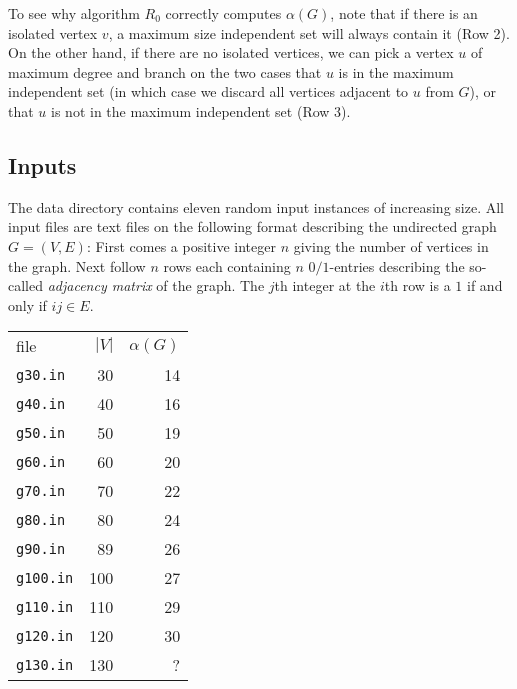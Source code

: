\documentclass{tufte-handout}
\begin{document}
\begin{enumerate}
\end{enumerate}
To see why algorithm $R_0$ correctly computes $\alpha(G)$, note that
if there is an isolated vertex $v$, a maximum size independent set
will always contain it (Row 2).
On the other hand, if there are no isolated vertices, we can pick a
vertex $u$ of maximum degree and branch on the two cases that $u$ is
in the maximum independent set (in which case we discard all vertices
adjacent to $u$ from $G$), or that $u$ is not in the maximum
independent set (Row 3).

\subsection{Inputs}

The data directory contains eleven random input instances of
increasing size. 
All input files are text files on the following format describing the
undirected graph $G=(V,E)$: First comes a positive integer $n$ giving
the number of vertices in the graph.
Next follow $n$ rows each containing $n$ $0/1$-entries describing the
so-called \emph{adjacency matrix} of the graph.
The $j$th integer at the $i$th row is a $1$ if and only if $ij\in E$.

\begin{marginfigure}
\begin{tabular}{lrr}
file & $|V|$ & $\alpha(G)$\\
 \texttt{g30.in} & 30 & 14\\
 \texttt{g40.in} & 40 & 16\\
 \texttt{g50.in} & 50 & 19\\
 \texttt{g60.in} & 60 & 20\\
 \texttt{g70.in} & 70 & 22\\
 \texttt{g80.in} & 80 & 24\\
 \texttt{g90.in} & 89 & 26\\
 \texttt{g100.in} & 100 & 27\\
 \texttt{g110.in} & 110 & 29\\
 \texttt{g120.in} & 120 & 30\\
 \texttt{g130.in} & 130 &  ? 
\end{tabular}
\end{marginfigure}
\end{document}
